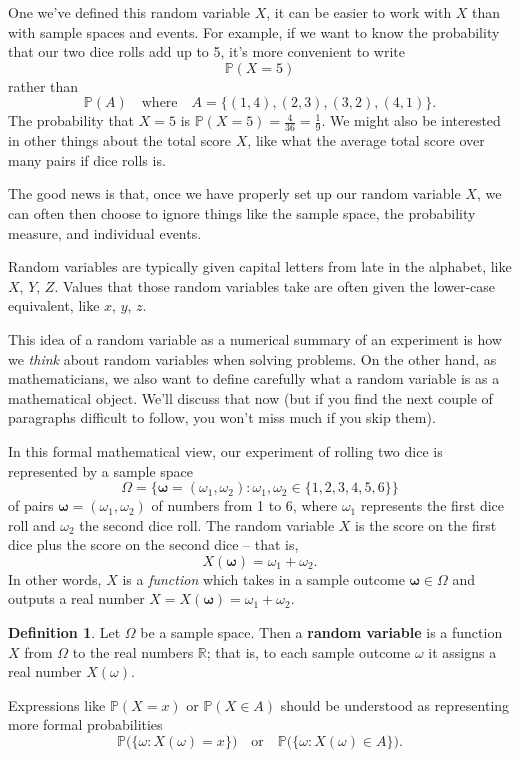 \documentclass[
  a4paper,
]{book}
\theoremstyle{definition}
\newtheorem{definition}{Definition}[chapter]
\theoremstyle{definition}
\theoremstyle{definition}
\theoremstyle{definition}
\theoremstyle{remark}
\begin{document}
One we've defined this random variable \(X\), it can be easier to work with \(X\) than with sample spaces and events. For example, if we want to know the probability that our two dice rolls add up to 5, it's more convenient to write
\[ \mathbb P(X = 5) \]
rather than
\[ \mathbb P(A) \quad \text{where} \quad A = \big\{ (1,4), (2,3), (3,2), (4,1) \big\} . \]
The probability that \(X = 5\) is \(\mathbb P(X = 5) = \frac{4}{36} = \frac{1}{9}\). We might also be interested in other things about the total score \(X\), like what the average total score over many pairs if dice rolls is.

The good news is that, once we have properly set up our random variable \(X\), we can often then choose to ignore things like the sample space, the probability measure, and individual events.

Random variables are typically given capital letters from late in the alphabet, like \(X\), \(Y\), \(Z\). Values that those random variables take are often given the lower-case equivalent, like \(x\), \(y\), \(z\).

This idea of a random variable as a numerical summary of an experiment is how we \emph{think} about random variables when solving problems. On the other hand, as mathematicians, we also want to define carefully what a random variable is as a mathematical object. We'll discuss that now (but if you find the next couple of paragraphs difficult to follow, you won't miss much if you skip them).

In this formal mathematical view, our experiment of rolling two dice is represented by a sample space
\[  \Omega = \big\{ \boldsymbol\omega = (\omega_1, \omega_2) : \omega_1, \omega_2 \in \{1,2,3,4,5,6\} \big\}  \]
of pairs \(\boldsymbol\omega = (\omega_1, \omega_2)\) of numbers from 1 to 6, where \(\omega_1\) represents the first dice roll and \(\omega_2\) the second dice roll.
The random variable \(X\) is the score on the first dice plus the score on the second dice -- that is,
\[ X(\boldsymbol\omega) = \omega_1 + \omega_2 . \]
In other words, \(X\) is a \emph{function} which takes in a sample outcome \(\boldsymbol\omega \in \Omega\) and outputs a real number \(X = X(\boldsymbol\omega) = \omega_1 + \omega_2\).

\begin{definition}
Let \(\Omega\) be a sample space. Then a \textbf{random variable} is a function \(X\) from \(\Omega\) to the real numbers \(\mathbb R\); that is, to each sample outcome \(\omega\) it assigns a real number \(X(\omega)\).

Expressions like \(\mathbb P(X = x)\) or \(\mathbb P(X \in A)\) should be understood as representing more formal probabilities
\[ \mathbb P \big( \{\omega : X(\omega) = x \}\big) \quad \text{or} \quad \mathbb P \big( \{\omega : X(\omega) \in A \}\big)  . \]
\end{definition}
\end{document}
